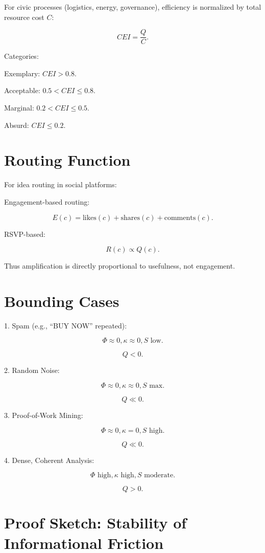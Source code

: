 \documentclass{book}
\begin{document}
For civic processes (logistics, energy, governance), efficiency is normalized by total resource cost \( C \):

\[ CEI = \frac{Q}{C}. \]

Categories:

Exemplary: \( CEI > 0.8 \).

Acceptable: \( 0.5 < CEI \leq 0.8 \).

Marginal: \( 0.2 < CEI \leq 0.5 \).

Absurd: \( CEI \leq 0.2 \).

\section{Routing Function}

For idea routing in social platforms:

Engagement-based routing:

\[ E(c) = \text{likes}(c) + \text{shares}(c) + \text{comments}(c). \]

RSVP-based:

\[ R(c) \propto Q(c). \]

Thus amplification is directly proportional to usefulness, not engagement.

\section{Bounding Cases}

1. Spam (e.g., ``BUY NOW'' repeated):

\[ \Phi \approx 0, \kappa \approx 0, S \text{ low}. \]

\[ Q < 0. \]

2. Random Noise:

\[ \Phi \approx 0, \kappa \approx 0, S \text{ max}. \]

\[ Q \ll 0. \]

3. Proof-of-Work Mining:

\[ \Phi \approx 0, \kappa = 0, S \text{ high}. \]

\[ Q \ll 0. \]

4. Dense, Coherent Analysis:

\[ \Phi \text{ high}, \kappa \text{ high}, S \text{ moderate}. \]

\[ Q > 0. \]

\section{Proof Sketch: Stability of Informational Friction}
\end{document}
